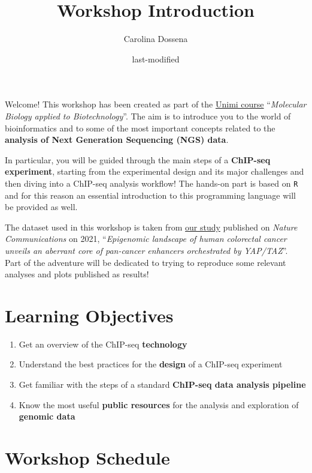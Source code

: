 \documentclass[
]{article}
\title{Workshop Introduction}
\author{Carolina Dossena}
\date{last-modified}
\providecommand{\tightlist}{%
  \setlength{\itemsep}{0pt}\setlength{\parskip}{0pt}}
\begin{document}
\maketitle

Welcome! This workshop has been created as part of the
\href{https://www.unimi.it/it/corsi/insegnamenti-dei-corsi-di-laurea/2024/molecular-biology-applied-biotechnology}{Unimi
course} ``\emph{Molecular Biology applied to Biotechnology}''. The aim
is to introduce you to the world of bioinformatics and to some of the
most important concepts related to the \textbf{analysis of Next
Generation Sequencing (NGS) data}.

In particular, you will be guided through the main steps of a
\textbf{ChIP-seq experiment}, starting from the experimental design and
its major challenges and then diving into a ChIP-seq analysis workflow!
The hands-on part is based on \texttt{R} and for this reason an
essential introduction to this programming language will be provided as
well.

The dataset used in this workshop is taken from
\href{https://www.nature.com/articles/s41467-021-22544-y\#MOESM1}{our
study} published on \emph{Nature Communications} on 2021,
``\emph{Epigenomic landscape of human colorectal cancer unveils an
aberrant core of pan-cancer enhancers orchestrated by YAP/TAZ}''. Part
of the adventure will be dedicated to trying to reproduce some relevant
analyses and plots published as results!

\hypertarget{learning-objectives}{%
\section{Learning Objectives}\label{learning-objectives}}

\begin{enumerate}
\def\labelenumi{\arabic{enumi}.}
\tightlist
\item
  Get an overview of the ChIP-seq \textbf{technology}
\item
  Understand the best practices for the \textbf{design} of a ChIP-seq
  experiment
\item
  Get familiar with the steps of a standard \textbf{ChIP-seq data
  analysis pipeline}
\item
  Know the most useful \textbf{public resources} for the analysis and
  exploration of \textbf{genomic data}
\end{enumerate}

\hypertarget{workshop-schedule}{%
\section{Workshop Schedule}\label{workshop-schedule}}
\end{document}
